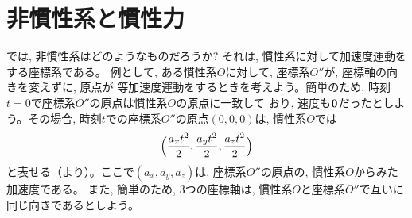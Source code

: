 \section{非慣性系と慣性力}

では, 非慣性系はどのようなものだろうか? それは, 慣性系に対して加速度運動をする座標系である。
例として, ある慣性系$O$に対して, 座標系$O''$が, 座標軸の向きを変えずに, 原点が
等加速度運動をするときを考えよう。簡単のため, 時刻$t=0$で座標系$O''$の原点は慣性系$O$の原点に一致して
おり, 速度も${\bf 0}$だったとしよう。その場合, 時刻$t$での座標系$O''$の原点$(0, 0, 0)$は, 慣性系$O$では
\begin{eqnarray}
\Bigl(\frac{a_xt^2}{2}, \frac{a_yt^2}{2}, \frac{a_zt^2}{2}\Bigr)
\end{eqnarray}
と表せる（より）。ここで$(a_x, a_y, a_z)$は, 座標系$O''$の原点の, 
慣性系$O$からみた加速度である。
また, 簡単のため, 3つの座標軸は, 慣性系$O$と座標系$O''$で互いに同じ向きであるとしよう。

